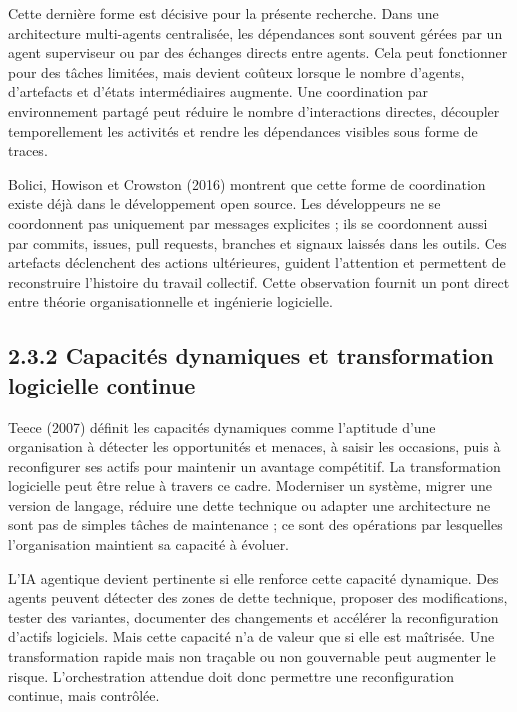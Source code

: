 Cette dernière forme est décisive pour la présente recherche. Dans une architecture multi-agents centralisée, les dépendances sont souvent gérées par un agent superviseur ou par des échanges directs entre agents. Cela peut fonctionner pour des tâches limitées, mais devient coûteux lorsque le nombre d'agents, d'artefacts et d'états intermédiaires augmente. Une coordination par environnement partagé peut réduire le nombre d'interactions directes, découpler temporellement les activités et rendre les dépendances visibles sous forme de traces.

Bolici, Howison et Crowston (2016) montrent que cette forme de coordination existe déjà dans le développement open source. Les développeurs ne se coordonnent pas uniquement par messages explicites ; ils se coordonnent aussi par commits, issues, pull requests, branches et signaux laissés dans les outils. Ces artefacts déclenchent des actions ultérieures, guident l'attention et permettent de reconstruire l'histoire du travail collectif. Cette observation fournit un pont direct entre théorie organisationnelle et ingénierie logicielle.

\subsection{2.3.2 Capacités dynamiques et transformation logicielle continue}\label{capacituxe9s-dynamiques-et-transformation-logicielle-continue}

Teece (2007) définit les capacités dynamiques comme l'aptitude d'une organisation à détecter les opportunités et menaces, à saisir les occasions, puis à reconfigurer ses actifs pour maintenir un avantage compétitif. La transformation logicielle peut être relue à travers ce cadre. Moderniser un système, migrer une version de langage, réduire une dette technique ou adapter une architecture ne sont pas de simples tâches de maintenance ; ce sont des opérations par lesquelles l'organisation maintient sa capacité à évoluer.

L'IA agentique devient pertinente si elle renforce cette capacité dynamique. Des agents peuvent détecter des zones de dette technique, proposer des modifications, tester des variantes, documenter des changements et accélérer la reconfiguration d'actifs logiciels. Mais cette capacité n'a de valeur que si elle est maîtrisée. Une transformation rapide mais non traçable ou non gouvernable peut augmenter le risque. L'orchestration attendue doit donc permettre une reconfiguration continue, mais contrôlée.

